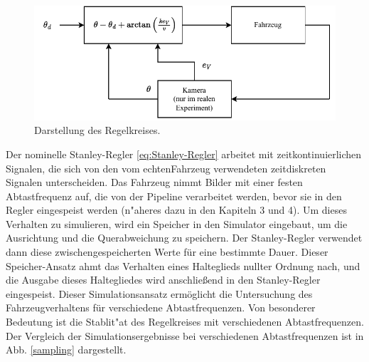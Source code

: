 \documentclass[arbeit=studie,oneside,BCOR=12mm]{ArbeitRST}
\begin{document}
\begin{figure}[h]
    \centering
    \includegraphics[scale=1.2]{control_loop}
    \caption{Darstellung des Regelkreises.}
    \label{control_loop}
\end{figure}

Der nominelle Stanley-Regler \eqref{eq:Stanley-Regler}
arbeitet mit zeitkontinuierlichen Signalen, die sich von den
vom \glqq echten\grqq Fahrzeug verwendeten zeitdiskreten Signalen
unterscheiden. Das Fahrzeug nimmt Bilder mit einer festen Abtastfrequenz auf,
die von der Pipeline verarbeitet werden, bevor sie in den Regler eingespeist
werden (n"aheres dazu in den Kapiteln 3 und 4). Um dieses Verhalten zu simulieren, wird ein Speicher in den Simulator
eingebaut, um die Ausrichtung und die Querabweichung zu speichern. Der
Stanley-Regler verwendet dann diese zwischengespeicherten Werte für eine
bestimmte Dauer. Dieser Speicher-Ansatz ahmt das Verhalten eines Halteglieds
nullter Ordnung nach, und die Ausgabe dieses Haltegliedes wird anschließend in
den Stanley-Regler eingespeist. Dieser Simulationsansatz ermöglicht die
Untersuchung des Fahrzeugverhaltens für verschiedene Abtastfrequenzen. Von
besonderer Bedeutung ist die Stablit"at des Regelkreises mit verschiedenen
Abtastfrequenzen. Der Vergleich der Simulationsergebnisse bei
verschiedenen Abtastfrequenzen ist in Abb. \ref{sampling} dargestellt. 
\end{document}
